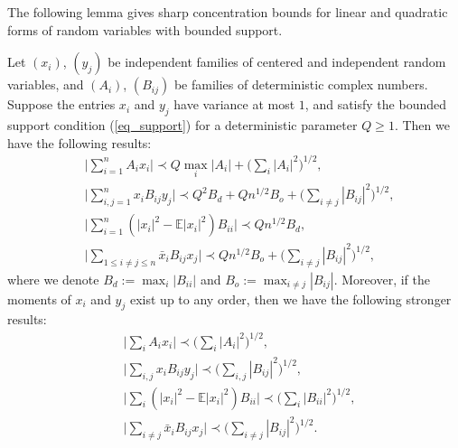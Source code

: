 \documentclass[aos,preprint]{imsart}
\begin{document}
The following lemma gives sharp concentration bounds for linear and quadratic forms of random variables with bounded support. %
\begin{lemma}\label{largedeviation}
Let $(x_i)$, $(y_j)$ be independent families of centered and independent random variables, and $(A_i)$, $(B_{ij})$ be families of deterministic complex numbers. Suppose the entries $x_i$ and $y_j$ have variance at most $1$, and satisfy the bounded support condition (\ref{eq_support}) for a deterministic parameter $Q \ge 1$. %
Then we have the following results:
\begin{align}
& \Big| \sum_{i=1}^n A_i x_i \Big\vert \prec Q \max_{i} \vert A_i \vert+ \Big(\sum_i |A_i|^2 \Big)^{1/2} ,\label{eq largedev10}  \\ 
& \Big\vert  \sum_{i,j=1}^n x_i B_{ij} y_j \Big\vert \prec Q^2 B_d  + Q n^{1/2}B_o +  \Big(\sum_{i\ne j} |B_{ij}|^2\Big)^{{1}/{2}},\label{eq largedev11}  \\
& \Big\vert  \sum_{i=1}^n (|x_i|^2-\mathbb E|x_i|^2) B_{ii}  \Big\vert  \prec Q n^{1/2}B_d   ,\label{eq largedev20}\\ 
&\Big\vert  \sum_{1\le i\ne j\le n} \bar x_i B_{ij} x_j \Big\vert  \prec Qn^{1/2}B_o +  \Big(\sum_{i\ne j} |B_{ij}|^2\Big)^{{1}/{2}} ,\label{eq largedev21}
\end{align}
where we denote $B_d:=\max_{i} |B_{ii} |$ and $B_o:= \max_{i\ne j} |B_{ij}|.$ Moreover, if the moments of $ x_i$ and $ y_j$ exist up to any order, then we have the following stronger results:
\begin{align}
& \Big\vert \sum_i A_i x_i \Big\vert \prec  \Big(\sum_i |A_i|^2 \Big)^{1/2} , \label{eq largedev0} \\
&  \Big\vert \sum_{i,j} x_i B_{ij} y_j \Big\vert \prec  \Big(\sum_{i, j} |B_{ij}|^2\Big)^{{1}/{2}}, \label{eq largedev1} \\
& \Big\vert  \sum_{i} (|x_i|^2-\mathbb E|x_i|^2) B_{ii}  \Big\vert  \prec  \Big( \sum_i |B_{ii} |^2\Big)^{1/2}  ,\label{eq largedev2} \\
&   \Big\vert  \sum_{i\ne j} \bar x_i B_{ij} x_j \Big\vert  \prec \Big(\sum_{i\ne j} |B_{ij}|^2\Big)^{{1}/{2}}.\label{eq largedev3}
\end{align}
\end{lemma}
\end{document}
